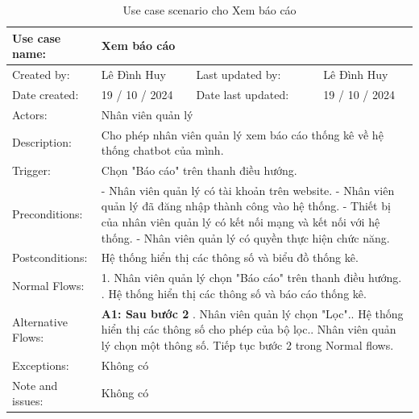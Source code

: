 \begin{table}[H]
    \centering
    \begin{tabular}{|l|l|l|l|} 
        \hline
        Use case name: & \multicolumn{3}{|l|}{Xem báo cáo} \\
        \hline
        Created by: & Lê Đình Huy & Last updated by: & Lê Đình Huy \\
        \hline
        Date created: & 19 / 10 / 2024 & Date last updated: & 19 / 10 / 2024 \\
        \hline
        Actors: & \multicolumn{3}{|l|}{Nhân viên quản lý} \\
        \hline
        Description: & \multicolumn{3}{|p{12cm}|}{Cho phép nhân viên quản lý xem báo cáo thống kê về hệ thống chatbot của mình.} \\ 
        \hline
        Trigger: & \multicolumn{3}{|p{12cm}|}{Chọn "Báo cáo" trên thanh điều hướng.} \\
        \hline
        Preconditions: & \multicolumn{3}{|p{12cm}|}{- Nhân viên quản lý có tài khoản trên website. \newline
        - Nhân viên quản lý đã đăng nhập thành công vào hệ thống. \newline
        - Thiết bị của nhân viên quản lý có kết nối mạng và kết nối với hệ thống. \newline
        - Nhân viên quản lý có quyền thực hiện chức năng.} \\
        \hline
        Postconditions: & \multicolumn{3}{|p{12cm}|}{Hệ thống hiển thị các thông số và biểu đồ thống kê.} \\
        \hline
        Normal Flows: & \multicolumn{3}{|p{12cm}|}{1. Nhân viên quản lý chọn "Báo cáo" trên thanh điều hướng. \newline
        2. Hệ thống hiển thị các thông số và báo cáo thống kê.}\\
        \hline
        Alternative Flows: & \multicolumn{3}{|p{12cm}|}{\textbf{A1: Sau bước 2} \newline
        3.1. Nhân viên quản lý chọn "Lọc".\newline
        3.2. Hệ thống hiển thị các thông số cho phép của bộ lọc.\newline
        3.3. Nhân viên quản lý chọn một thông số.\newline
        Tiếp tục bước 2 trong Normal flows.
        } \\
        \hline
        Exceptions: & \multicolumn{3}{|p{12cm}|}{Không có} \\
        \hline
        Note and issues: & \multicolumn{3}{|p{12cm}|}{Không có} \\
        \hline
    \end{tabular}
    \caption{Use case scenario cho Xem báo cáo}
\end{table}

